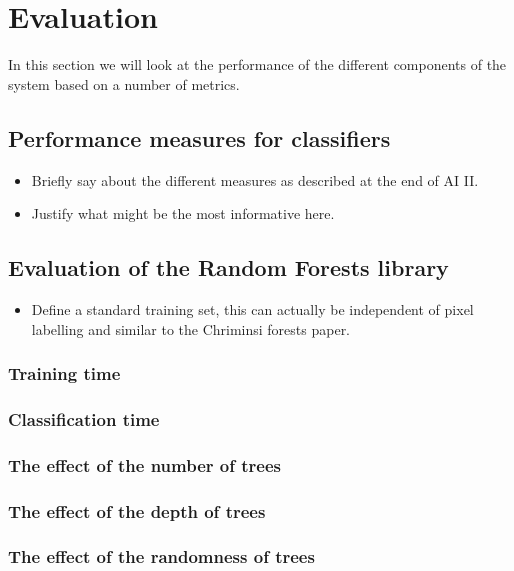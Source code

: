 \documentclass[12pt,twoside,notitlepage]{report}
\begin{document}

\cleardoublepage
\chapter{Evaluation}
    In this section we will look at the performance of the different components of the system based on a number of 
    metrics. 

    \section{Performance measures for classifiers}
        \begin{itemize}
            \item Briefly say about the different measures as described at the end of AI II.
            \item Justify what might be the most informative here.
        \end{itemize}

    \section{Evaluation of the Random Forests library}
        \begin{itemize}
            \item Define a standard training set, this can actually be independent of pixel labelling and similar to the Chriminsi forests paper.
        \end{itemize}

        \subsection{Training time}
        \subsection{Classification time}
        \subsection{The effect of the number of trees}
        \subsection{The effect of the depth of trees}
        \subsection{The effect of the randomness of trees}
\end{document}
